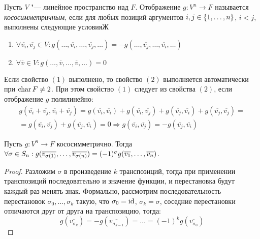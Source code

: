 \begin{definition}
	Пусть $V$ "--- линейное пространство над $F$. Отображение $g: V^n \rightarrow F$ называется \textit{кососимметричным}, если для любых позиций аргументов $i, j \in \{1, \dotsc, n\}$, $i < j$, выполнены следующие условияЖ
	\begin{enumerate}
		\item $\forall \overline{v_i}, \overline{v_j} \in V: g(\dots, \overline{v_i}, \dots, \overline{v_j}, \dots) = -g(\dots, \overline{v_j}, \dots, \overline{v_i}, \dots)$
		\item $\forall \overline{v} \in V: g(\dots, \overline{v}, \dots, \overline{v}, \dots) = 0$
	\end{enumerate}
\end{definition}

\begin{note}
	Если свойство $(1)$ выполнено, то свойство $(2)$ выполняется автоматически при $\operatorname{char}{F} \ne 2$. При этом свойство $(1)$ следует из свойства $(2)$, если отображение $g$ полилинейно:
	\begin{multline*}
		g(\overline{v_i} + \overline{v_j}, \overline{v_i} + \overline{v_j}) = g(\overline{v_i}, \overline{v_i}) + g(\overline{v_i}, \overline{v_j}) + g(\overline{v_j}, \overline{v_i}) + g(\overline{v_j}, \overline{v_j}) =\\
		= g(\overline{v_i}, \overline{v_j}) + g(\overline{v_j}, \overline{v_i}) = 0 \Rightarrow g(\overline{v_i}, \overline{v_j}) = -g(\overline{v_j}, \overline{v_i})
	\end{multline*}
\end{note}

\begin{proposition}
	Пусть $g : V^n \rightarrow F$ кососимметрично. Тогда $\forall \sigma \hm{\in} S_n: g(\overline{v_{\sigma(1)}}, \dots, \overline{v_{\sigma(n)}}) = (-1)^\sigma g(\overline{v_1}, \dots, \overline{v_n})$.
\end{proposition}

\begin{proof}
	Разложим $\sigma$ в произведение $k$ транспозиций, тогда при применении транспозиций последовательно и значение функции, и перестановка будут каждый раз менять знак. Формально, рассмотрим последовательность перестановок $\sigma_0, \dots, \sigma_k$ такую, что $\sigma_0 = \mathrm{id}$, $\sigma_k = \sigma$, соседние перестановки отличаются друг от друга на транспозицию, тогда:
	\[g(\overline{v_{\sigma_k}}) = -g(\overline{v_{\sigma_{k - 1}}}) = \dots = (-1)^kg(\overline{v_{\sigma_{0}}})\]
\end{proof}

